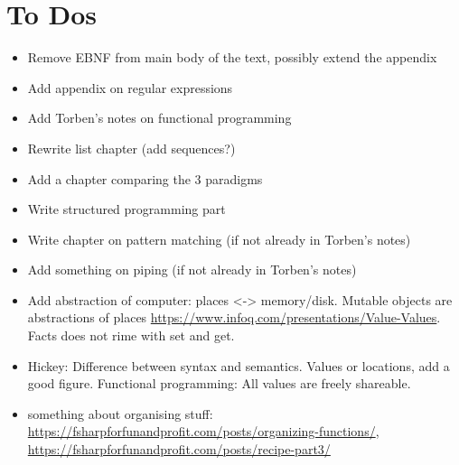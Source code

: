 \chapter{To Dos}
\begin{itemize}
\item Remove EBNF from main body of the text, possibly extend the
  appendix
\item Add appendix on regular expressions
\item Add Torben's notes on functional programming
\item Rewrite list chapter (add sequences?)
\item Add a chapter comparing the 3 paradigms
\item Write structured programming part
\item Write chapter on pattern matching (if not already in Torben's
  notes)
\item Add something on piping (if not already in Torben's notes)
\item Add abstraction of computer: places <-> memory/disk. Mutable
  objects are abstractions of places
  \url{https://www.infoq.com/presentations/Value-Values}. Facts does
  not rime with set and get. 
\item Hickey: Difference between syntax and semantics. Values or
  locations, add a good figure. Functional programming: All values are
  freely shareable.
\item something about organising stuff: \url{https://fsharpforfunandprofit.com/posts/organizing-functions/},
  \url{https://fsharpforfunandprofit.com/posts/recipe-part3/}
\end{itemize}
